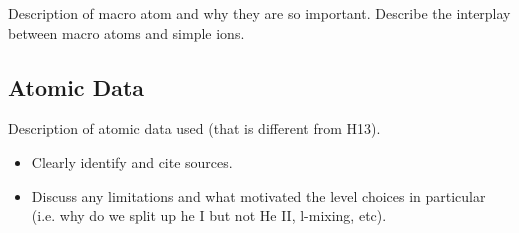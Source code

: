 \documentclass[preprint, a4paper, 11pt]{aastex}
\begin{document}
Description of macro atom and why they are so important. Describe the interplay between macro atoms
and simple ions.



\subsection{Atomic Data}
Description of atomic data used (that is different from H13).
\begin{itemize}
\item Clearly identify and cite sources. 
\item Discuss any limitations and what motivated the level choices in particular 
(i.e. why do we split up he I but not He II, l-mixing, etc).
\end{itemize}

\end{document}
